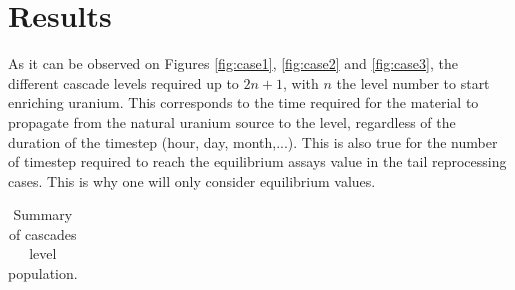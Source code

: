 \section{Results}
As it can be observed on Figures \ref{fig:case1}, \ref{fig:case2} and
\ref{fig:case3}, the different cascade levels required up to $2n+1$, with $n$ the
level number to start enriching uranium. This corresponds to the time required
for the material to propagate from the natural uranium source to the level,
regardless of the duration of the timestep (hour, day, month,...). This is also
true for the number of timestep required to reach the equilibrium assays value in
the tail reprocessing cases. This is why one will only consider equilibrium
values.

\begin{table}[h!]
\centering
  \caption{Summary of cascades level population.}
\begin{tabular}{ccccccccc}
\toprule


\end{tabular}
\end{table}
